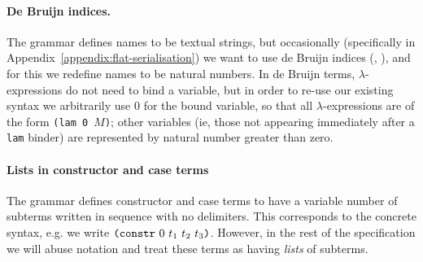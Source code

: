 
\paragraph{De Bruijn indices.}
The grammar defines names to be textual strings, but occasionally (specifically
in Appendix~\ref{appendix:flat-serialisation}) we want to use de Bruijn indices
(\cite{deBruijn}, \cite[C.3]{Barendregt}), and for this we redefine names to be
natural numbers.  In de Bruijn terms, $\lambda$-expressions do not need to bind
a variable, but in order to re-use our existing syntax we arbitrarily use 0 for
the bound variable, so that all $\lambda$-expressions are of the form
\texttt{(lam 0 $M$)}; other variables (ie, those not appearing immediately after
a \texttt{lam} binder) are represented by natural number greater than zero.

\paragraph{Lists in constructor and case terms}
The grammar defines constructor and case terms to have a variable number of
subterms written in sequence with no delimiters. This corresponds to the
concrete syntax, e.g. we write $\texttt{(} \texttt{constr} ~ 0 ~ t_1\ t_2\ t_3 \texttt{)}$. However, in the
rest of the specification we will abuse notation and treat these terms as
having \emph{lists} of subterms.
